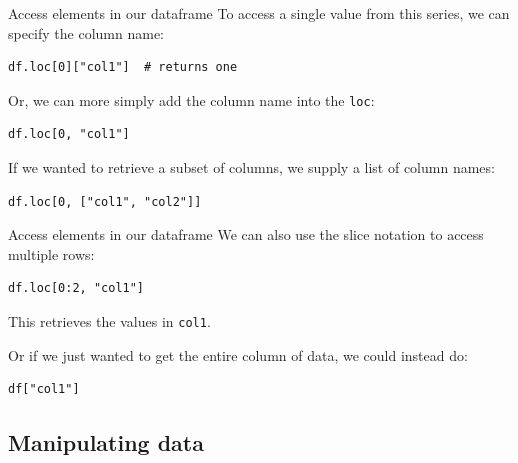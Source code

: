 \documentclass[10pt]{beamer}
\begin{document}
\begin{frame}[label={sec:orge747456},fragile]{Access elements in our dataframe}
 To access a single value from this series, we can specify the column name:

\begin{verbatim}
df.loc[0]["col1"]  # returns one
\end{verbatim}

Or, we can more simply add the column name into the \texttt{loc}:

\begin{verbatim}
df.loc[0, "col1"]
\end{verbatim}

If we wanted to retrieve a subset of columns, we supply a list of column names:

\begin{verbatim}
df.loc[0, ["col1", "col2"]]
\end{verbatim}
\end{frame}

\begin{frame}[label={sec:orgda5c3cc},fragile]{Access elements in our dataframe}
 We can also use the slice notation to access multiple rows:

\begin{verbatim}
df.loc[0:2, "col1"]
\end{verbatim}

This retrieves the values in \texttt{col1}.

Or if we just wanted to get the entire column of data, we could instead do:

\begin{verbatim}
df["col1"]
\end{verbatim}
\end{frame}

\subsection{Manipulating data}
\label{sec:org98c7f78}
\end{document}
